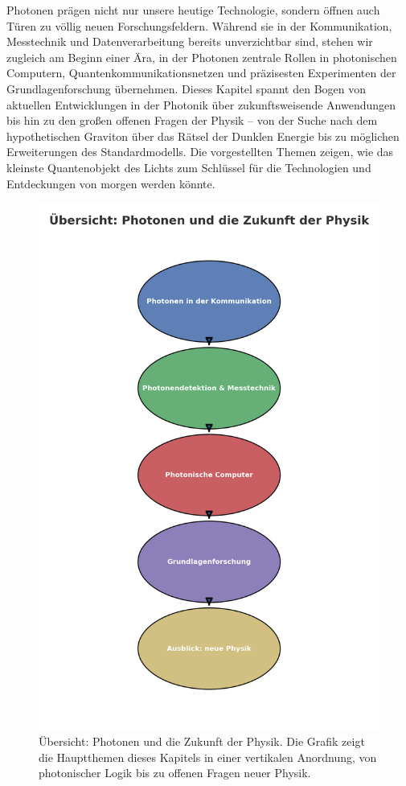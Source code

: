 Photonen prägen nicht nur unsere heutige Technologie, sondern öffnen auch Türen zu völlig neuen Forschungsfeldern. 
Während sie in der Kommunikation, Messtechnik und Datenverarbeitung bereits unverzichtbar sind, stehen wir zugleich am Beginn einer Ära, in der Photonen zentrale Rollen in photonischen Computern, Quantenkommunikationsnetzen und präzisesten Experimenten der Grundlagenforschung übernehmen.  
Dieses Kapitel spannt den Bogen von aktuellen Entwicklungen in der Photonik über zukunftsweisende Anwendungen bis hin zu den großen offenen Fragen der Physik – von der Suche nach dem hypothetischen Graviton über das Rätsel der Dunklen Energie bis zu möglichen Erweiterungen des Standardmodells. 
Die vorgestellten Themen zeigen, wie das kleinste Quantenobjekt des Lichts zum Schlüssel für die Technologien und Entdeckungen von morgen werden könnte.
\begin{figure}[H]
	\centering
	\includegraphics[width=0.75\linewidth]{bilder/kapitel_VII_uebersicht.png}
	\caption[Übersicht Kapitel~VII]{Übersicht: Photonen und die Zukunft der Physik. 
		Die Grafik zeigt die Hauptthemen dieses Kapitels in einer vertikalen Anordnung, 
		von photonischer Logik bis zu offenen Fragen neuer Physik.}
	\label{fig:kapitel_VII_uebersicht}
\end{figure}

